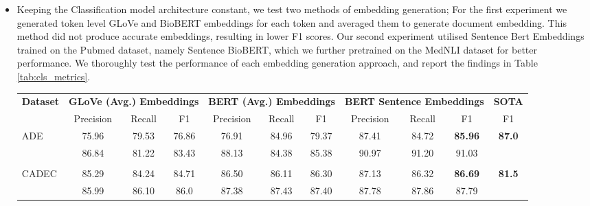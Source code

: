 \documentclass[letterpaper]{article}
\begin{document}
\begin{itemize}
    \item Keeping the Classification model architecture constant, we test two methods of embedding generation; For the first experiment we generated token level GLoVe and BioBERT embeddings for each token and averaged them to generate document embedding. This method did not produce accurate embeddings, resulting in lower F1 scores. Our second experiment utilised Sentence Bert Embeddings \cite{DBLP:journals/corr/abs-1908-10084} trained on the Pubmed dataset, namely Sentence BioBERT, which we further pretrained on the MedNLI dataset \cite{shivade2019mednli} for better performance. We thoroughly test the performance of each embedding generation approach, and report the findings in Table \ref{tab:cls_metrics}.
    
\begin{table*}[ht]
\centering
\begin{tabular}{lcccccccccc}
\toprule
\multirow{2}{*}{\textbf{Dataset}} & \multicolumn{3}{c}{\textbf{GLoVe (Avg.) Embeddings}} & \multicolumn{3}{c}{\textbf{BERT (Avg.) Embeddings}} & \multicolumn{3}{c}{\textbf{BERT Sentence Embeddings}} & \textbf{SOTA}\\
\multirow{2}{*}{} & Precision & Recall & F1 & Precision & Recall & F1 & Precision & Recall & F1 & F1 \\
\midrule
\multirow{2}{*}{ADE} & 75.96 & 79.53 & 76.86 & 76.91 & 84.96 & 79.37 & 87.41 & 84.72 & \textbf{85.96} & \textbf{87.0} \\
 & 86.84 & 81.22 & 83.43 & 88.13 & 84.38 & 85.38 & 90.97 & 91.20 & 91.03 & \\
 & & & & & & & & & \\
\multirow{2}{*}{CADEC} & 85.29 & 84.24 & 84.71 & 86.50 & 86.11 & 86.30 & 87.13 & 86.32 & \textbf{86.69} & \textbf{81.5}\\
 & 85.99 & 86.10 & 86.0 & 87.38 & 87.43  & 87.40 & 87.78 & 87.86 & 87.79 &  \\
\bottomrule
\end{tabular}
\caption{Classification Metrics on benchmark datasets. For each dataset, Macro and Micro averaged scores are displayed on first and second row respectively. SOTA metrics for ADE and CADEC datasets are obtained from \cite{huynh-etal-2016-adverse} and \cite{sota_cadec_cls} respectively.}
\label{tab:cls_metrics}
\end{table*}

\begin{table*}
\centering
{}
\end{table*}
\end{itemize}
\end{document}
